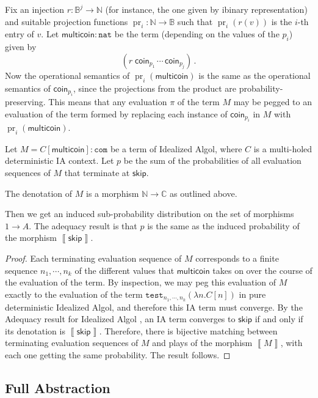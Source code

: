 \documentclass{svproc}
\newcommand{\deno}[1]{\left\llbracket#1\right\rrbracket}
\DeclareMathOperator\pr{pr}
\newcommand{\test}{\texttt{test}}
\newcommand{\nat}{{\mathtt{nat}}}
\newcommand*\from{\colon}
\newcommand{\0}{{\mathtt{0}}} \newcommand{\com}{{\mathtt{com}}}
\newcommand{\skipp}{{\mathsf{skip}}}
\newcommand{\bN}{\mathbb{N}}
\newcommand{\bB}{\mathbb{B}}
\newcommand{\bC}{\mathbb{C}}
\newcommand{\coin}{\textsf{coin}}
\newcommand{\multicoin}{\textsf{multicoin}}
\begin{document}
Fix an injection $r\from\bB^j\to \bN$ (for instance, the one given by ibinary representation) and suitable projection functions $\pr_i \from \bN \to \bB$ such that $\pr_i(r(v))$ is the $i$-th entry of $v$.
Let $\multicoin\from\nat$ be the term (depending on the values of the $p_i$) given by
\[
  (r\;\coin_{p_1}\,\cdots\,\coin_{p_j})\,.
  \]
Now the operational semantics of $\pr_i(\multicoin)$ is the same as the operational semantics of $\coin_{p_i}$, since the projections from the product are probability-preserving.  
This means that any evaluation $\pi$ of the term $M$ may be pegged to an evaluation of the term formed by replacing each instance of $\coin_{p_i}$ in $M$ with $\pr_i(\multicoin)$.

\begin{proposition}
  Let $M = C[\multicoin]\from \com$ be a term of Idealized Algol, where $C$ is a multi-holed deterministic IA context.
  Let $p$ be the sum of the probabilities of all evaluation sequences of $M$ that terminate at $\skipp$.

  The denotation of $M$ is a morphism $\bN \to \bC$ as outlined above.

  Then we get an induced sub-probability distribution on the set of morphisms $1\to A$.  
  The adequacy result is that $p$ is the same as the induced probability of the morphism $\deno{\skipp}$.
\end{proposition}
\begin{proof}
  Each terminating evaluation sequence of $M$ corresponds to a finite sequence $n_1,\cdots,n_k$ of the different values that $\multicoin$ takes on over the course of the evaluation of the term.  
  By inspection, we may peg this evaluation of $M$ exactly to the evaluation of the term $\test_{n_1,\cdots,n_k} (\lambda n.C[n])$ in pure deterministic Idealized Algol, and therefore this IA term must converge.  
  By the Adequacy result for Idealized Algol \cite{SamsonGuyIAPassive}, an IA term converges to $\skipp$ if and only if its denotation is $\deno{\skipp}$.  
  Therefore, there is bijective matching between terminating evaluation sequences of $M$ and plays of the morphism $\deno{M}$, with each one getting the same probability.  
  The result follows.
\end{proof}

\subsection{Full Abstraction}
\end{document}
